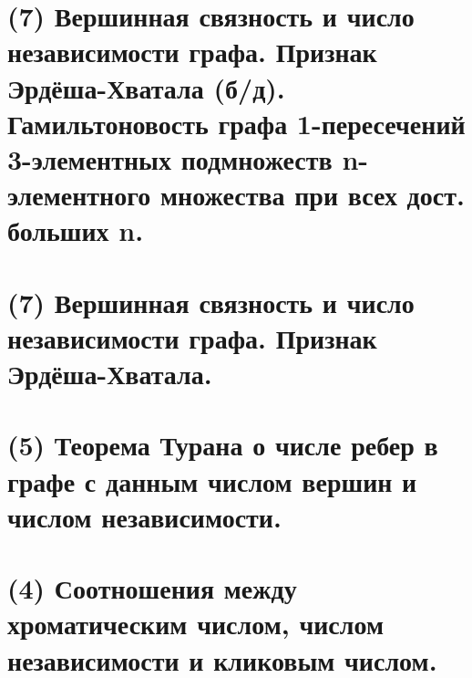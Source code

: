 \section{(7) Вершинная связность и число независимости графа. Признак Эрдёша-Хватала (б/д). Гамильтоновость графа 1-пересечений 3-элементных подмножеств n-элементного множества при всех дост. больших n.}

\newpage{}

\section{(7) Вершинная связность и число независимости графа. Признак Эрдёша-Хватала.}

\newpage{}


\section{(5) Теорема Турана о числе ребер в графе с данным числом вершин и числом независимости.}

\newpage{}

\section{(4) Соотношения между хроматическим числом, числом независимости и кликовым числом.}

\newpage{}

